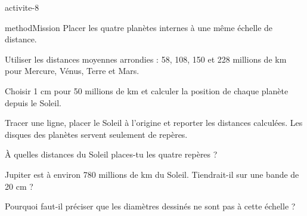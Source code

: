 \documentclass[12pt,twoside,openany]{book}
\begin{document}
\label{ch-8-activite}
\begin{pcFiche}{activite-8}
\begin{pcEncadre}{method}{Mission}
Placer les quatre planètes internes à une même échelle de distance.\par
\end{pcEncadre}
\begin{questions}
\item Utiliser les distances moyennes arrondies : 58, 108, 150 et 228 millions de km pour Mercure, Vénus, Terre et Mars.
\item Choisir 1 cm pour 50 millions de km et calculer la position de chaque planète depuis le Soleil.
\item Tracer une ligne, placer le Soleil à l’origine et reporter les distances calculées. Les disques des planètes servent seulement de repères.
\end{questions}
\begin{questions}
\item À quelles distances du Soleil places-tu les quatre repères ?
\item Jupiter est à environ 780 millions de km du Soleil. Tiendrait-il sur une bande de 20 cm ?
\item Pourquoi faut-il préciser que les diamètres dessinés ne sont pas à cette échelle ?
\end{questions}
\end{pcFiche}
\label{ch-8-bilan}
\end{document}
